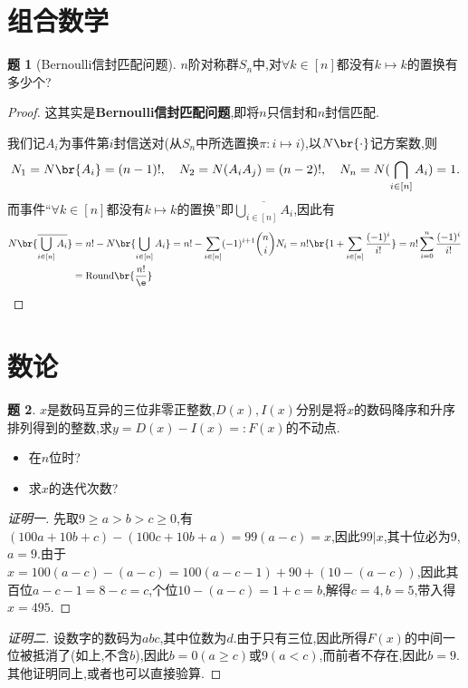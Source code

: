 \documentclass{article}
\theoremstyle{definition}
\newtheorem{exercise}{题}[section]
\begin{document}
\section{组合数学}
\begin{exercise}[Bernoulli信封匹配问题]
    $n$阶对称群$S_n$中,对$\forall k\in [n]$都没有$k\mapsto k$的置换有多少个?
\end{exercise}
\begin{proof}
    这其实是\textbf{Bernoulli信封匹配问题},即将$n$只信封和$n$封信匹配.

    我们记$A_i$为事件第$i$封信送对(从$S_n$中所选置换$\pi:i\mapsto i$),以$N\br{\cdot}$记方案数,则
    $$N_1=N\br{A_i}=(n-1)!,\quad N_2=N(A_iA_j)=(n-2)!,\quad N_n=N(\bigcap_{i\in [n]}A_i)=1.$$
    而事件“$\forall k\in [n]$都没有$k\mapsto k$的置换”即$ \overline{\bigcup_{i\in [n]}A_i}$,因此有
    $$\begin{aligned}
        N\br{\overline{\bigcup_{i\in [n]}A_i}}&=n!-N\br{\bigcup_{i\in [n]}A_i}=n!-\sum_{i\in [n]}(-1)^{i+1}\binom{n}{i}N_i=n!\br{1+\sum_{i\in [n]}\frac{(-1)^i}{i!}}=n!\sum_{i=0}^n\frac{(-1)^i}{i!}\\
        &=\mathrm{Round}\br{\frac{n!}{\e}}
    \end{aligned}$$
\end{proof}

\section{数论}

\begin{exercise}
    $x$是数码互异的三位非零正整数,$D(x),I(x)$分别是将$x$的数码降序和升序排列得到的整数,求$y=D(x)-I(x)=:F(x)$的不动点.
        \begin{itemize}
            \item 在$n$位时?
            \item 求$x$的迭代次数?
        \end{itemize}
\end{exercise}
\begin{proof}[证明一]
    先取$9\geq a>b>c\geq 0$,有$(100a+10b+c)-(100c+10b+a)=99(a-c)=x$,因此$99|x$,其十位必为9,$a=9$.由于$x=100(a-c)-(a-c)=100(a-c-1)+90+(10-(a-c))$,因此其百位$a-c-1=8-c=c$,个位$10-(a-c)=1+c=b$,解得$c=4,b=5$,带入得$x=495$.
\end{proof}
\begin{proof}[证明二]
        设数字的数码为$abc$,其中位数为$d$.由于只有三位,因此所得$F(x)$的中间一位被抵消了(如上,不含$b$),因此$b=0(a\geq c)$或$9(a<c)$,而前者不存在,因此$b=9$.其他证明同上,或者也可以直接验算.
\end{proof}
\end{document}
